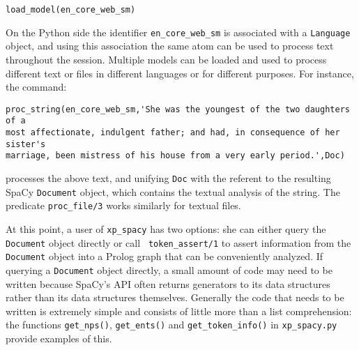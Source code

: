 \begin{verbatim}
load_model(en_core_web_sm) 
\end{verbatim}

\noindent
On the Python side the identifier {\tt en\_core\_web\_sm} is
associated with a {\tt Language} object, and using this
association the same atom can be used to process text throughout the
session.  Multiple models can be loaded and used to process different
text or files in different languages or for different purposes.  For
instance, the command:

\begin{verbatim}
proc_string(en_core_web_sm,'She was the youngest of the two daughters of a
most affectionate, indulgent father; and had, in consequence of her sister's
marriage, been mistress of his house from a very early period.',Doc)
\end{verbatim}

\noindent
processes the above text, and unifying {\tt Doc} with the referent to
the resulting SpaCy {\tt Document} object, which contains the textual
analysis of the string.  The predicate {\tt proc\_file/3} works
similarly for textual files.

At this point, a user of {\tt xp\_spacy} has two options: she can
either query the {\tt Document} object directly or call {\tt
  token\_assert/1} to assert information from the {\tt Document}
object into a Prolog graph that can be conveniently analyzed.  If
querying a {\tt Document} object directly, a small amount of code may
need to be written because SpaCy's API often returns generators to its
data structures rather than its data structures themselves.  Generally
the code that needs to be written is extremely simple and consists of
little more than a list comprehension: the functions {\tt get\_nps()},
{\tt get\_ents()} and {\tt get\_token\_info()} in {\tt xp\_spacy.py}
provide examples of this.


